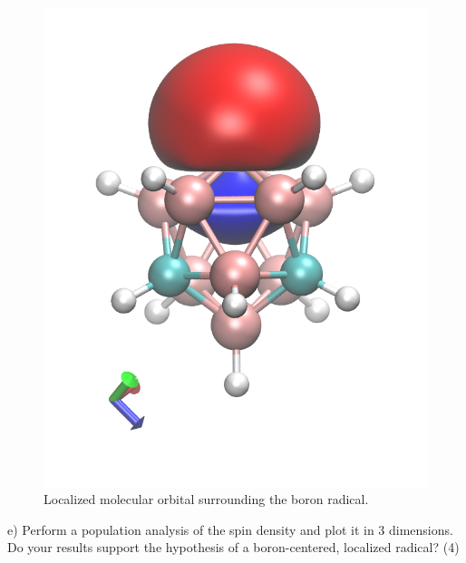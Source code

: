 \documentclass{article}
\begin{document}
\begin{figure}[H]
  \centering
  \includegraphics[scale=0.25]{almo_37.png}
  \caption{Localized molecular orbital surrounding the boron radical.}
  \label{fig:almo_37}
\end{figure}

\noindent e) Perform a population analysis of the spin density and plot
it in 3 dimensions. Do your results support the hypothesis of a boron-centered,
localized radical? (4)
\end{document}
